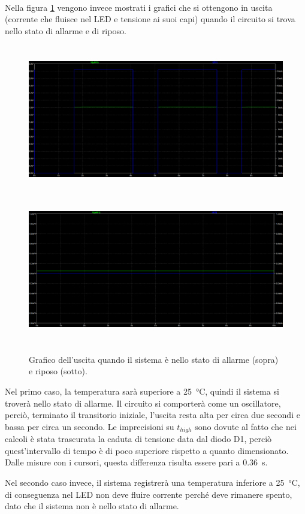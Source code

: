 \documentclass{report}
\begin{document}
\\Nella figura \ref{figura:555out} vengono invece mostrati i grafici che si ottengono in uscita (corrente che fluisce nel LED e tensione ai suoi capi) quando il circuito si trova nello stato di allarme e di riposo. \par
\begin{figure}[h!]
	\centering
	\includegraphics[height=6.5cm]{immagini/555on}
	\includegraphics[height=6.5cm]{immagini/555off}
	\caption{Grafico dell'uscita quando il sistema è nello stato di allarme (sopra) e riposo (sotto).} 
	\label{figura:555out}
\end{figure}
Nel primo caso, la temperatura sarà superiore a \SI{25}{\celsius}, quindi il sistema si troverà nello stato di allarme. Il circuito si comporterà come un oscillatore, perciò, terminato il transitorio iniziale, l'uscita resta alta per circa due secondi e bassa per circa un secondo. Le imprecisioni su $t_{high}$ sono dovute al fatto che nei calcoli è stata trascurata la caduta di tensione data dal diodo D1, perciò quest'intervallo di tempo è di poco superiore rispetto a quanto dimensionato. Dalle misure con i cursori, questa differenza risulta essere pari a \SI{0.36}{\second}. \par
Nel secondo caso invece, il sistema registrerà una temperatura inferiore a \SI{25}{\celsius}, di conseguenza nel LED non deve fluire corrente perché deve rimanere spento, dato che il sistema non è nello stato di allarme.
\newpage
\end{document}
